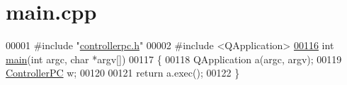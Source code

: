 \hypertarget{main_8cpp_source}{\section{main.\-cpp}
}

\begin{DoxyCode}
00001 \textcolor{preprocessor}{#include "\hyperlink{controllerpc_8h}{controllerpc.h}"}
00002 \textcolor{preprocessor}{#include <QApplication>}
\hypertarget{main_8cpp_source_l00116}{}\hyperlink{main_8cpp_a0ddf1224851353fc92bfbff6f499fa97}{00116} \textcolor{keywordtype}{int} \hyperlink{main_8cpp_a0ddf1224851353fc92bfbff6f499fa97}{main}(\textcolor{keywordtype}{int} argc, \textcolor{keywordtype}{char} *argv[])
00117 \{
00118     QApplication a(argc, argv);
00119     \hyperlink{class_controller_p_c}{ControllerPC} w;
00120 
00121     \textcolor{keywordflow}{return} a.exec();
00122 \}
\end{DoxyCode}
